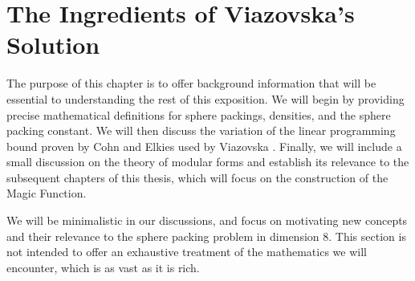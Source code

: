 \chapter{The Ingredients of Viazovska's Solution}
\thispagestyle{empty}

The purpose of this chapter is to offer background information that will be essential to understanding the rest of this exposition. We will begin by providing precise mathematical definitions for sphere packings, densities, and the sphere packing constant. We will then discuss the variation of the linear programming bound proven by Cohn and Elkies \cite[Theorem 3.1]{CohnElkies} used by Viazovska \cite[Theorem 2]{Viazovska8}. Finally, we will include a small discussion on the theory of modular forms and establish its relevance to the subsequent chapters of this thesis, which will focus on the construction of the Magic Function.

We will be minimalistic in our discussions, and focus on motivating new concepts and their relevance to the sphere packing problem in dimension $8$. This section is not intended to offer an exhaustive treatment of the mathematics we will encounter, which is as vast as it is rich.



